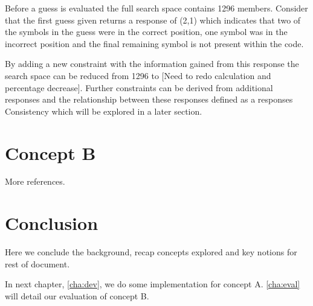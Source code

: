 Before a guess is evaluated the full search space contains 1296 members. Consider that the first guess given returns a response of (2,1) which indicates that two of the symbols in the guess were in the correct position, one symbol was in the incorrect position and the final remaining symbol is not present within the code.

By adding a new constraint with the information gained from this response the search space can be reduced from 1296 to [Need to redo calculation and percentage decrease]. Further constraints can be derived from additional responses and the relationship between these responses defined as a responses Consistency which will be explored in a later section.


\section{Concept B}
\label{sec:back_B}

More references.

\section{Conclusion}
\label{sec:back_concl}

Here we conclude the background, recap concepts explored and key notions for rest of document.

In next chapter, \cref{cha:dev}, we do some implementation for concept A. \cref{cha:eval} will detail our evaluation of concept B.